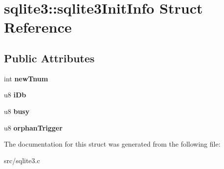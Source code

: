 \hypertarget{structsqlite3_1_1sqlite3_init_info}{\section{sqlite3\-:\-:sqlite3\-Init\-Info Struct Reference}
\label{structsqlite3_1_1sqlite3_init_info}
}
\subsection*{Public Attributes}
\begin{DoxyCompactItemize}
\item 
\hypertarget{structsqlite3_1_1sqlite3_init_info_a65250c8c5f215989e64294ede6c1c268}{int {\bfseries new\-Tnum}}\label{structsqlite3_1_1sqlite3_init_info_a65250c8c5f215989e64294ede6c1c268}

\item 
\hypertarget{structsqlite3_1_1sqlite3_init_info_af72389cb54753544c0f578605e6604bb}{u8 {\bfseries i\-Db}}\label{structsqlite3_1_1sqlite3_init_info_af72389cb54753544c0f578605e6604bb}

\item 
\hypertarget{structsqlite3_1_1sqlite3_init_info_a6ac01842e0ae68023cb60fea93bd8688}{u8 {\bfseries busy}}\label{structsqlite3_1_1sqlite3_init_info_a6ac01842e0ae68023cb60fea93bd8688}

\item 
\hypertarget{structsqlite3_1_1sqlite3_init_info_ac292839cc81d109206133a80949c45a6}{u8 {\bfseries orphan\-Trigger}}\label{structsqlite3_1_1sqlite3_init_info_ac292839cc81d109206133a80949c45a6}

\end{DoxyCompactItemize}


The documentation for this struct was generated from the following file\-:\begin{DoxyCompactItemize}
\item 
src/sqlite3.\-c\end{DoxyCompactItemize}
